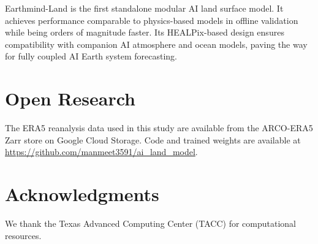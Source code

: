 \documentclass[11pt]{article}
\begin{document}
Earthmind-Land is the first standalone modular AI land surface model. It achieves performance comparable to physics-based models in offline validation while being orders of magnitude faster. Its HEALPix-based design ensures compatibility with companion AI atmosphere and ocean models, paving the way for fully coupled AI Earth system forecasting.

\section*{Open Research}

The ERA5 reanalysis data used in this study are available from the ARCO-ERA5 Zarr store on Google Cloud Storage. Code and trained weights are available at \url{https://github.com/manmeet3591/ai_land_model}.

\section*{Acknowledgments}

We thank the Texas Advanced Computing Center (TACC) for computational resources.


\end{document}
